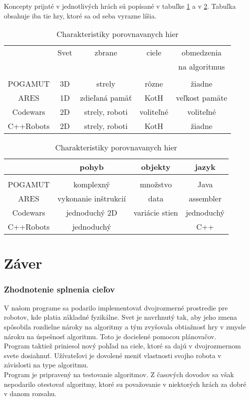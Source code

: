 Koncepty prijaté v jednotlivých hrách sú popísané v tabuľke \ref{table::porovnanie1} a v \ref{table::porovnanie2}. Tabuľka obsahuje iba tie hry, ktoré sa od seba vyrazne líšia. 
\begin{table}
\centering
\caption { Charakteristiky porovnavanych hier } %
\begin{tabular}{|c|c|c|c|c|}
	&Svet	&zbrane& ciele & obmedzenia \\
	&	&	& 	&na algoritmus 		\\
\hline \\
POGAMUT & 3D & strely & rôzne & žiadne \\
ARES & 1D & zdieľaná pamäť & KotH & veľkost pamäte \\
Codewars &2D & strely, roboti & voliteľné & voliteľné \\
C++Robots &2D& strely, roboti & KotH & žiadne  \\ 
\end{tabular}
\label{table::porovnanie1}
\end{table}

\begin{table}
\centering
\caption { Charakteristiky porovnavanych hier } %
\begin{tabular}{|c|c|c|c|}
	&pohyb &objekty&jazyk \\
\hline \\
POGAMUT & komplexný &množstvo&Java \\
ARES & vykonanie inštrukcií & data & assembler\\
Codewars & jednoduchý 2D& variácie stien &jednoduchý \\
C++Robots & jednoduchý & & C++ \\ 
\end{tabular}
\label{table::porovnanie2}
\end{table}

\chapter {Záver}
\subsection{Zhodnotenie splnenia cieľov}
V našom programe sa podarilo implementovať dvojrozmerné prostredie pre robotov, kde platia základné fyzikálne. Svet je navrhnutý tak, aby jeho zmena spôsobila rozdielne nároky na algoritmy a tým zvyšovala obtiažnosť hry v zmysle nároku na úspešnosť algoritmu. Toto je docielené pomocou plánovačov. \\
Program taktiež priniesol nový pohľad na ciele, ktoré sa dajú v dvojrozmernom svete dosiahnuť. Užívateľovi je dovolené meniť vlastnosti svojho robota v závislosti na type algoritmu.\\
Program je pripravený na testovanie algoritmov. Z časových dovodov sa však nepodarilo otestovať algoritmy, ktoré su považovanie v niektorých hrách za dobré v danom rozsahu. 

